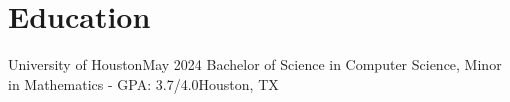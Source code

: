 \section{Education}
\resumeSubHeadingListStart
    \resumeSubheading
    {University of Houston}{May 2024}
    {Bachelor of Science in Computer Science, Minor in Mathematics - GPA: 3.7/4.0}{Houston, TX}
    \resumeItemListStart
    \resumeItemListEnd
\resumeSubHeadingListEnd
